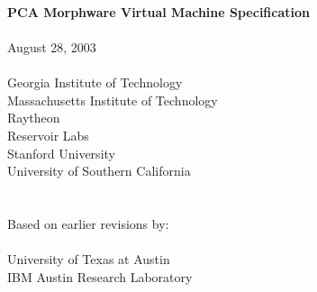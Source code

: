 \documentclass[10pt]{article}
\begin{document}
  \begin{titlepage}
    \begin{center}
      {\LARGE
	~ \\ ~ \\ ~ \\ ~ \\ ~ \\ ~ \\ ~ \\ ~ \\
	{\bf PCA Morphware Virtual Machine Specification \\ ~ \\}
      }
      {\Large
	August 28, 2003 \\ ~ \\
      }
      {\large
	Georgia Institute of Technology \\
	Massachusetts Institute of Technology \\ Raytheon \\ Reservoir Labs \\ Stanford University \\ University of Southern California \\ ~ \\ ~ \\ 
	Based on earlier revisions by: \\ ~ \vspace{-8pt} \\
	University of Texas at Austin \\ IBM Austin Research Laboratory
      }
    \end{center}
  \end{titlepage}

  \newcommand{\mt}[1]{\mbox{\it #1}}
  \newcommand{\todo}[1]{\framebox{\bf #1}}
  \newcommand{\sss}[1]{\medskip \noindent {\bf #1} \smallskip}
  \newcommand{\ssss}[1]{\medskip \noindent {\bf #1:}}
  \newcommand{\makeline}[0]{\rule{0cm}{0cm}\\\hrule\rule{0cm}{0cm}}

  \newcommand{\lp}[2]{\raisebox{-6pt}{\parbox{#1}{#2 \vspace{2pt}}}}
  \newcommand{\lpp}[2]{\raisebox{-13pt}{\parbox{#1}{#2 \vspace{2pt}}}}

  \newcommand{\name}[1]{

    \medskip \noindent {\bf #1}
  }

  \newcommand{\decl}[1]{

    \medskip \noindent {\tt #1} \medskip
  }
\end{document}
